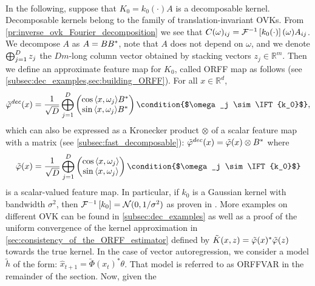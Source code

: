 \paragraph{}
In the following, suppose that $K_0=k_0(\cdot) A$ is a decomposable kernel.
Decomposable kernels belong to the family of translation-invariant \acsp{OVK}.
From \cref{pr:inverse_ovk_Fourier_decomposition} we see that
$C(\omega)_{ij}=\mathcal{F}^{-1}\left[k_0(\cdot)\right](\omega)A_{ij}$. We decompose $A$ as
$A=BB^*$, note that $A$ does not depend on $\omega$, and we denote
$\operatorname*{\bigoplus}_{j=1}^D z_j$ the $Dm$-long column vector obtained by stacking vectors
$z_j \in \mathbb{R}^m$. Then we define an approximate feature map for $K_0$,
called \acf{ORFF} map \citep{brault2016scaling} as follows (see
\cref{subsec:dec_examples,sec:building_ORFF}). For all $x\in\mathbb{R}^d$,
\begin{dmath*}
    \tilde{\Phi}^{dec}(x) = \frac{1}{\sqrt{D}}\Vect_{j=1}^D
    \begin{pmatrix}
        \cos{\inner{x,\omega_j}}B^\adjoint \\
        \sin{\inner{x,\omega_j}}B^\adjoint
    \end{pmatrix} \condition{$\omega_j \sim \IFT{k_0}$},
    \label{eq:generation}
\end{dmath*}
which can also be expressed as a Kronecker product $\otimes$ of a scalar
feature map with a matrix (see \cref{subsec:fast_decomposable}):
$\tilde{\Phi}^{dec}(x) = \tilde{\phi}(x)\otimes B^\adjoint$ where
\begin{dmath*}
    \tilde{\phi}(x) = \frac{1}{\sqrt{D}}\Vect_{j=1}^D
    \begin{pmatrix}
        \cos{\inner{x,\omega_j}} \\ 
        \sin{\inner{x,\omega_j}}
    \end{pmatrix}\condition{$\omega_j \sim \IFT{k_0}$}
\end{dmath*}
is a scalar-valued feature map. In particular, if $k_0$ is a Gaussian kernel
with bandwidth $\sigma^2$, then $\mathcal{F}^{-1}\left[k_0\right]=\mathcal{N}(0, 1/\sigma^2)$ as
proven in \citet{Rahimi2007}. More examples on different OVK can be found in
\cref{subsec:dec_examples} as well as a proof of the uniform convergence of the
kernel approximation in \cref{sec:consistency_of_the_ORFF_estimator} defined by
$\tilde{K}(x,z)=\tilde{\Phi}(x)^\adjoint\tilde{\Phi}(z)$ towards the true
kernel. In the case of vector autoregression, we consider a model $\tilde{h}$
of the form: $\hat{x}_{t+1}=\tilde{\Phi}(x_t)^*\theta$. That model is referred
to as \ac{ORFFVAR} in the remainder of the section. Now, given the
